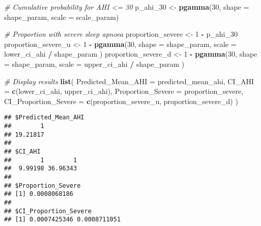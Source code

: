 \documentclass[
]{article}
\newenvironment{Shaded}{\begin{snugshade}}{\end{snugshade}}
\newcommand{\AttributeTok}[1]{\textcolor[rgb]{0.13,0.29,0.53}{#1}}
\newcommand{\CommentTok}[1]{\textcolor[rgb]{0.56,0.35,0.01}{\textit{#1}}}
\newcommand{\DecValTok}[1]{\textcolor[rgb]{0.00,0.00,0.81}{#1}}
\newcommand{\FunctionTok}[1]{\textcolor[rgb]{0.13,0.29,0.53}{\textbf{#1}}}
\newcommand{\NormalTok}[1]{#1}
\newcommand{\OtherTok}[1]{\textcolor[rgb]{0.56,0.35,0.01}{#1}}
\newcommand{\SpecialCharTok}[1]{\textcolor[rgb]{0.81,0.36,0.00}{\textbf{#1}}}
\begin{document}
\begin{Shaded}
\begin{Highlighting}[]
\CommentTok{\# Cumulative probability for AHI \textless{}= 30}
\NormalTok{p\_ahi\_30 }\OtherTok{\textless{}{-}} \FunctionTok{pgamma}\NormalTok{(}\DecValTok{30}\NormalTok{, }\AttributeTok{shape =}\NormalTok{ shape\_param, }\AttributeTok{scale =}\NormalTok{ scale\_param)}

\CommentTok{\# Proportion with severe sleep apnoea}
\NormalTok{proportion\_severe }\OtherTok{\textless{}{-}} \DecValTok{1} \SpecialCharTok{{-}}\NormalTok{ p\_ahi\_30}
\NormalTok{proportion\_severe\_u }\OtherTok{\textless{}{-}} \DecValTok{1} \SpecialCharTok{{-}} \FunctionTok{pgamma}\NormalTok{(}\DecValTok{30}\NormalTok{, }\AttributeTok{shape =}\NormalTok{ shape\_param, }\AttributeTok{scale =}\NormalTok{ lower\_ci\_ahi }\SpecialCharTok{/}\NormalTok{ shape\_param )}
\NormalTok{proportion\_severe\_d }\OtherTok{\textless{}{-}} \DecValTok{1} \SpecialCharTok{{-}} \FunctionTok{pgamma}\NormalTok{(}\DecValTok{30}\NormalTok{, }\AttributeTok{shape =}\NormalTok{ shape\_param, }\AttributeTok{scale =}\NormalTok{ upper\_ci\_ahi }\SpecialCharTok{/}\NormalTok{ shape\_param )}

\CommentTok{\# Display results}
\FunctionTok{list}\NormalTok{(}
  \AttributeTok{Predicted\_Mean\_AHI =}\NormalTok{ predicted\_mean\_ahi,}
  \AttributeTok{CI\_AHI =} \FunctionTok{c}\NormalTok{(lower\_ci\_ahi, upper\_ci\_ahi),}
  \AttributeTok{Proportion\_Severe =}\NormalTok{ proportion\_severe, }
  \AttributeTok{CI\_Proportion\_Severe =} \FunctionTok{c}\NormalTok{(proportion\_severe\_u, proportion\_severe\_d)}
\NormalTok{)}
\end{Highlighting}
\end{Shaded}

\begin{verbatim}
## $Predicted_Mean_AHI
##        1 
## 19.21817 
## 
## $CI_AHI
##        1        1 
##  9.99198 36.96343 
## 
## $Proportion_Severe
## [1] 0.0008068186
## 
## $CI_Proportion_Severe
## [1] 0.0007425346 0.0008711051
\end{verbatim}
\end{document}
